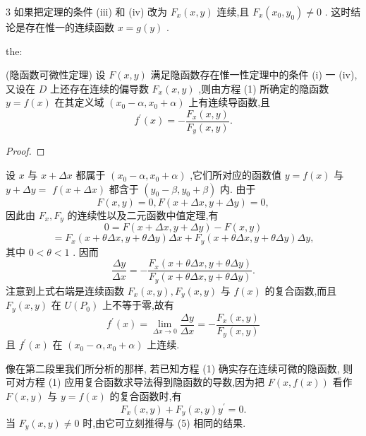 \begin{remark}

\end{remark}
3 如果把定理的条件 (iii) 和 (iv) 改为 \({F}_{x}\left( {x,y}\right)\) 连续,且 \({F}_{x}\left( {{x}_{0},{y}_{0}}\right)  \neq  0\) . 这时结论是存在惟一的连续函数 \(x = g\left( y\right)\) .

\begin{theorem}{}{the:}

\end{theorem}
 (隐函数可微性定理) 设 \(F\left( {x,y}\right)\) 满足隐函数存在惟一性定理中的条件 (i) 一 (iv),又设在 \(D\) 上还存在连续的偏导数 \({F}_{x}\left( {x,y}\right)\) ,则由方程 (1) 所确定的隐函数 \(y = f\left( x\right)\) 在其定义域 \(\left( {{x}_{0} - \alpha ,{x}_{0} + \alpha }\right)\) 上有连续导函数,且
\[
{f}^{\prime }\left( x\right)  =  - \frac{{F}_{x}\left( {x,y}\right) }{{F}_{y}\left( {x,y}\right) }. \tag{5}
\]
\begin{proof}

\end{proof}
设 \(x\) 与 \(x + {\Delta x}\) 都属于 \(\left( {{x}_{0} - \alpha ,{x}_{0} + \alpha }\right)\) ,它们所对应的函数值 \(y = f\left( x\right)\) 与 \(y + {\Delta y} =\)  \(f\left( {x + {\Delta x}}\right)\) 都含于 \(\left( {{y}_{0} - \beta ,{y}_{0} + \beta }\right)\) 内. 由于
\[
F\left( {x,y}\right)  = 0,F\left( {x + {\Delta x},y + {\Delta y}}\right)  = 0,
\]
因此由 \({F}_{x},{F}_{y}\) 的连续性以及二元函数中值定理,有
\[
0 = F\left( {x + {\Delta x},y + {\Delta y}}\right)  - F\left( {x,y}\right)
\]
\[
= {F}_{x}\left( {x + {\theta \Delta x},y + {\theta \Delta y}}\right) {\Delta x} + {F}_{y}\left( {x + {\theta \Delta x},y + {\theta \Delta y}}\right) {\Delta y},
\]
其中 \(0 < \theta  < 1\) . 因而
\[
\frac{\Delta y}{\Delta x} =  - \frac{{F}_{x}\left( {x + {\theta \Delta x},y + {\theta \Delta y}}\right) }{{F}_{y}\left( {x + {\theta \Delta x},y + {\theta \Delta y}}\right) }.
\]
注意到上式右端是连续函数 \({F}_{x}\left( {x,y}\right) ,{F}_{y}\left( {x,y}\right)\) 与 \(f\left( x\right)\) 的复合函数,而且 \({F}_{y}\left( {x,y}\right)\) 在 \(U\left( {P}_{0}\right)\) 上不等于零,故有
\[
{f}^{\prime }\left( x\right)  = \mathop{\lim }\limits_{{{\Delta x} \rightarrow  0}}\frac{\Delta y}{\Delta x} =  - \frac{{F}_{x}\left( {x,y}\right) }{{F}_{y}\left( {x,y}\right) }
\]
且 \({f}^{\prime }\left( x\right)\) 在 \(\left( {{x}_{0} - \alpha ,{x}_{0} + \alpha }\right)\) 上连续.

像在第二段里我们所分析的那样, 若已知方程 (1) 确实存在连续可微的隐函数, 则可对方程 (1) 应用复合函数求导法得到隐函数的导数,因为把 \(F\left( {x,f\left( x\right) }\right)\) 看作 \(F\left( {x,y}\right)\) 与 \(y = f\left( x\right)\) 的复合函数时,有
\[
{F}_{x}\left( {x,y}\right)  + {F}_{y}\left( {x,y}\right) {y}^{\prime } = 0. \tag{6}
\]
当 \({F}_{y}\left( {x,y}\right)  \neq  0\) 时,由它可立刻推得与 (5) 相同的结果.


